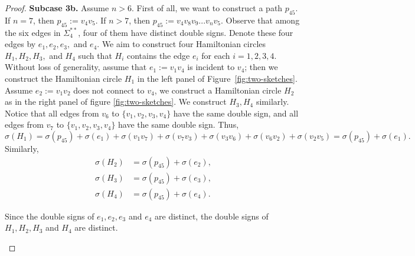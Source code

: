 \documentclass[12pt]{amsart}
\theoremstyle{plain}
\theoremstyle{definition}%
\begin{document}
\begin{proof}
\textbf{Subcase 3b.} Assume $n>6.$                                         First of all, we want to construct a path $p_{45}$. If $n=7$, then $p_{45}:=v_4v_5$. If $n>7$, then   $p_{45}:=v_4v_8v_9...v_nv_5$.    Observe that among the six edges in \(\Sigma_4^{**}\), four of them have distinct double signs.
Denote these four edges by \(e_1, e_2, e_3,\) and \(e_4\).  
We aim to construct four Hamiltonian circles \(H_1, H_2, H_3,\) and \(H_4\) such that \(H_i\) contains the edge \(e_i\) for each \(i=1,2,3,4\).  
Without loss of generality, assume that \(e_1:=v_1v_4\) is incident to \(v_4\); then we construct the Hamiltonian circle \(H_1\) in the left panel of Figure~\ref{fig:two-sketches}.
Assume $e_2:=v_1v_2$ does not connect to $v_4$, we construct a Hamiltonian circle $H_2$ as in the right panel of figure \ref{fig:two-sketches}. We construct $H_3,H_4$ similarly.   Notice that all edges from \(v_6\) to \(\{v_1,v_2,v_3,v_4\}\) have the same double sign, and all edges from \(v_7\) to \(\{v_1,v_2,v_3,v_4\}\) have the same double sign.   Thus, $$\sigma(H_1)=\sigma(p_{45})+\sigma(e_1)+\sigma(v_1v_7)+\sigma(v_7v_3)+\sigma(v_3v_6)+\sigma(v_6v_2)+\sigma(v_2v_5)=\sigma(p_{45})+\sigma(e_1).$$
Similarly, \begin{align*}
\sigma(H_2) &= \sigma(p_{45})+\sigma(e_2),\\
\sigma(H_3) &= \sigma(p_{45})+\sigma(e_3),\\
\sigma(H_4) &= \sigma(p_{45})+\sigma(e_4).
\end{align*}


Since the double signs of $e_1,e_2,e_3$ and $e_4$ are distinct, the double signs of $H_1,H_2,H_3 $ and $H_4$ are distinct. 

\begin{figure}[H]
\centering

\begin{minipage}{0.45\textwidth}
\centering
{}
\end{minipage}
\end{figure}
\end{proof}
\end{document}
